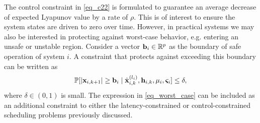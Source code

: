 \begin{remark}\label{remark_worst_case}\normalfont
The control constraint in \eqref{eq_c22} is formulated to guarantee an average decrease of expected Lyapunov value by a rate of $\rho$. This is of interest to ensure the system states are driven to zero over time. However, in practical systems we may also be interested in protecting against worst-case behavior, e.g. entering an unsafe or unstable region. Consider a vector ${\mathbf b}_i \in {\mathbb R}^p$ as the boundary of safe operation of system $i$. A constraint that protects against exceeding this boundary can be written as
%
\begin{align}\label{eq_worst_case}
\P [ |\bbx_{i,k+1}| \geq \bbb_i \mid \hbx^{(l_i)}_{i,k},\bbh_{i,k},\mu_i,\bbsigma_i ] \leq \delta,
\end{align}
%
where $\delta \in (0,1)$ is small. The expression in \eqref{eq_worst_case} can be included as an additional constraint to either the latency-constrained or control-constrained scheduling problems previously discussed.
\end{remark}